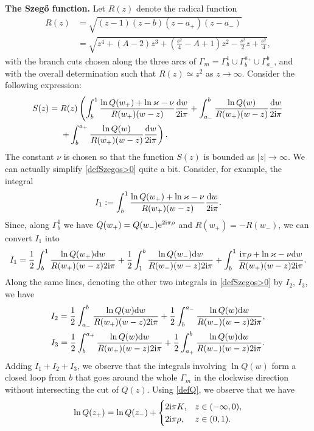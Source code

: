 \documentclass[10pt,a4paper]{amsart}
\numberwithin{equation}{section}
\theoremstyle{definition}
\def\le{\left}
\def\ri{\right}
\def \d{{\mathrm d}}
\begin{document}
{\bf The Szeg\H{o} function.}
Let $R(z)$ denote the radical function
\begin{align}
R(z) &=\sqrt{(z-1)(z-b)(z-a_+)(z-a_-)} \nonumber\\
&= \sqrt{
z^4 + (A-2)z^3 + \le(\frac {s^2}4 - A+1\ri) z^2 - \frac {s^2}2 z + \frac {s^2}4},\label{defR}
\end{align}
with the branch cuts chosen along the three arcs of $\Gamma_m = \Gamma_b^1\cup \Gamma_{b}^{a_+} \cup \Gamma_{a_-}^b$, and with the overall determination such that $R(z) \simeq z^2$ as $z\to\infty$.
Consider the following expression:
\begin{align}
S(z) ={}& R(z) \left(
\int_b^1\frac{\ln Q(w_+) + \ln \varkappa-\nu}{R(w_+)(w-z)} \frac{\d w}{2{\rm i}\pi}
+
\int_{a_-}^b\frac{\ln Q(w)}{R(w_+)(w-z)} \frac{\d w}{2{\rm i}\pi}\right.\nonumber\\
&\left.
+
\int_b^{a_+} \frac{\ln Q(w) }{R(w_+)(w-z)} \frac{\d w}{2{\rm i}\pi}
 \right).\label{defSzegos>0}
\end{align}
The constant $\nu$ is chosen so that the function $S(z)$ is bounded as $|z|\to\infty$.
We can actually simplify \eqref{defSzegos>0} quite a bit. Consider, for example, the integral
\[
I_1:= \int_b^1\frac{\ln Q(w_+) + \ln \varkappa-\nu}{R(w_+)(w-z)} \frac{\d w}{2{\rm i}\pi}.
\]
Since, along $\Gamma_b^1$ we have $Q(w_+) = Q(w_-) {\rm e}^{2{\rm i}\pi { {\rho}}}$ and $R(w_+)=-R(w_-)$, we can convert $I_1$ into
\[
I_1 = \frac 1 2 \int_{b}^1 \frac {\ln Q(w_+) \d w}{R(w_+)(w-z)2{\rm i}\pi} + \frac 1 2 \int_{1}^b \frac {\ln Q(w_-) \d w}{R(w_-)(w-z)2{\rm i}\pi} + \int_{b}^1 \frac{{\rm i}\pi { {\rho}} + \ln \varkappa -\nu \d w}{R(w_+)(w-z)2{\rm i}\pi}.
\]
Along the same lines, denoting the other two integrals in \eqref{defSzegos>0} by $I_2$, $I_3$, we have
\begin{gather*}
I_2 = \frac 1 2\int_{a_-}^b \frac {\ln Q(w) \d w}{R(w_+)(w-z)2{\rm i}\pi} + \frac 1 2\int^{a_-}_b \frac {\ln Q(w) \d w}{R(w_-)(w-z)2{\rm i}\pi},
\\
I_3 = \frac 1 2\int^{a_+}_b \frac {\ln Q(w) \d w}{R(w_+)(w-z)2{\rm i}\pi} + \frac 1 2\int_{a_+}^b \frac {\ln Q(w) \d w}{R(w_-)(w-z)2{\rm i}\pi}.
\end{gather*}
Adding $I_1+I_2+I_3$, we observe that the integrals involving $\ln Q(w)$ form a closed loop from $b$ that goes around the whole $\Gamma_m$ in the clockwise direction without intersecting the cut of $Q(z)$.
Using \eqref{defQ}, we observe that we have
\[
\ln Q(z_+) = \ln Q(z_-) + \begin{cases}
 2{\rm i}\pi{K},& z\in (-\infty,0),\\
2{\rm i}\pi{\rho}, & z\in (0,1).
\end{cases}
\]
\end{document}
